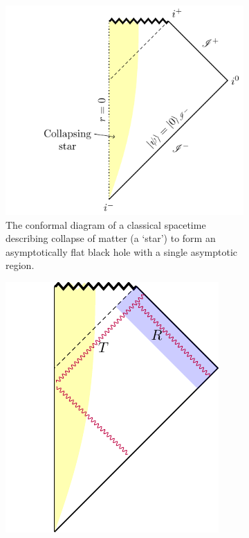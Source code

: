 \documentclass[letterpaper,12pt]{article}
\begin{document}
\begin{figure}
\centering
\begin{subfigure}[t]{.5\textwidth}
	\includegraphics[width=\textwidth]{collapse.pdf}
	\caption{The conformal diagram of a classical spacetime describing collapse of matter (a `star') to form an asymptotically flat black hole with a single asymptotic region.   \label{fig:collapse}}
\end{subfigure}
\hfill
\begin{subfigure}[t]{.4\textwidth}\centering
	\includegraphics[width=.8\textwidth]{propagate.pdf}

\end{subfigure}
\end{figure}
\end{document}
